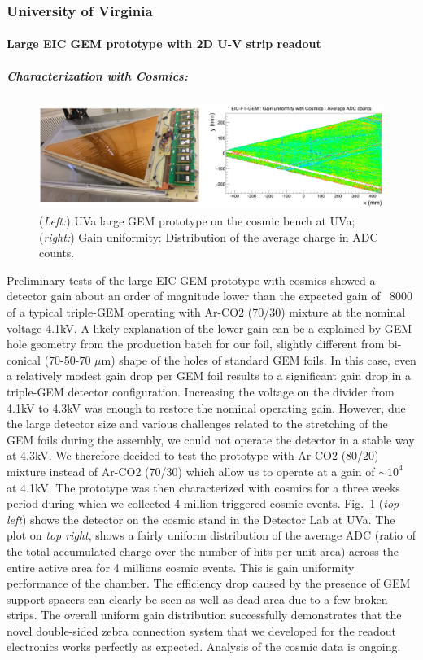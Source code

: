 \subsubsection{University of Virginia} 
%
\paragraph*{Large EIC GEM prototype with 2D U-V strip readout}%
\subparagraph*{\textbf  Characterization with Cosmics:}
% 
\begin{figure}[htb]
\centering
\includegraphics[width=1\columnwidth,trim={0pt 0mm 0pt 0mm},clip]{UVa_plots/eicCosmics}
\caption{\label{fig:eicCosmics}({\it Left:}) UVa large GEM prototype on the cosmic bench at UVa;  ({\it right:}) Gain uniformity: Distribution of the average charge in ADC counts.}
\end{figure}
%
Preliminary tests of the large EIC GEM prototype with cosmics showed a detector gain about an order of magnitude lower than the expected gain of ~8000 of a typical triple-GEM operating with Ar-CO2 (70/30) mixture at the nominal voltage 4.1kV. A likely explanation of the lower gain can be a explained by GEM hole geometry from the production batch for our foil, slightly different from  bi-conical (70-50-70 $\mu$m) shape  of the holes of standard GEM foils. In this case, even a relatively modest gain drop per GEM foil results to a significant gain drop in a triple-GEM detector configuration. Increasing the voltage on the divider from 4.1kV to 4.3kV was enough to restore the nominal operating gain. However, due the large detector size and various challenges related to the  stretching of the GEM foils during the assembly, we could not operate the detector in a stable way at 4.3kV. We therefore decided to test the prototype with Ar-CO2 (80/20) mixture instead of Ar-CO2 (70/30) which allow us to operate at a gain of $\sim 10^4$  at 4.1kV. The prototype was then characterized with cosmics for a three weeks period during which we collected 4  million triggered cosmic events. Fig.~\ref{fig:eicCosmics} ({\it top left}) shows the detector on the cosmic stand in the Detector Lab at UVa.  The plot on {\it top right}, shows a fairly uniform distribution of the average ADC (ratio of the total accumulated charge over the number of hits per unit area)  across  the entire active area for 4 millions cosmic events. This is gain uniformity performance of the chamber. The efficiency drop caused by the presence of GEM support spacers can clearly be seen as well as dead area due to a few broken strips.  The overall uniform gain distribution successfully demonstrates that the novel double-sided zebra connection system that we developed for the readout electronics works perfectly as expected. Analysis of the cosmic data is ongoing.
